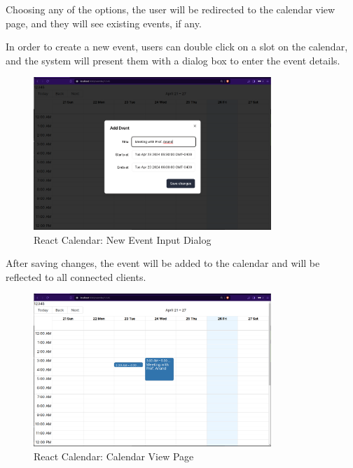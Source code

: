 Choosing any of the options, the user will be redirected to the calendar view page, and they will see existing events, if any. 

In order to create a new event, users can double click on a slot on the calendar, and the system will present them with a dialog box to enter the event details.

\begin{figure}[H]
    \centering
    \includegraphics[width=0.8\textwidth]{diagrams/CalendarAppCreateEvent.png}
    \caption{React Calendar: New Event Input Dialog}
    \label{fig:enter-label}
\end{figure}

After saving changes, the event will be added to the calendar and will be reflected to all connected clients.

\begin{figure}[H]
    \centering
    \includegraphics[width=0.8\textwidth]{diagrams/CalendarAppMain.png}
    \caption{React Calendar: Calendar View Page}
    \label{fig:enter-label}
\end{figure}


